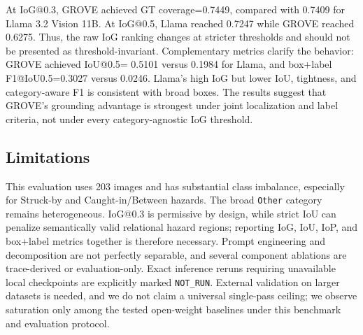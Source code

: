 At IoG@0.3, GROVE achieved GT coverage=0.7449, compared
with 0.7409 for Llama 3.2 Vision 11B. At
IoG@0.5, Llama reached 0.7247 while GROVE
reached 0.6275. Thus, the raw IoG ranking changes at
stricter thresholds and should not be presented as threshold-invariant.
Complementary metrics clarify the behavior: GROVE achieved IoU@0.5=
0.5101 versus
0.1984 for Llama, and box+label
F1@IoU0.5=0.3027 versus
0.0246. Llama's high IoG
but lower IoU, tightness, and category-aware F1 is consistent with broad boxes.
The results suggest that GROVE's grounding advantage is strongest under joint
localization and label criteria, not under every category-agnostic IoG
threshold.

\subsection{Limitations}

This evaluation uses 203 images and has substantial class imbalance, especially
for Struck-by and Caught-in/Between hazards. The broad \texttt{Other} category
remains heterogeneous. IoG@0.3 is permissive by design, while strict IoU can
penalize semantically valid relational hazard regions; reporting IoG, IoU, IoP,
and box+label metrics together is therefore necessary. Prompt engineering and
decomposition are not perfectly separable, and several component ablations are
trace-derived or evaluation-only. Exact inference reruns requiring unavailable
local checkpoints are explicitly marked \texttt{NOT\_RUN}. External
validation on larger datasets is needed, and we do not claim a universal
single-pass ceiling; we observe saturation only among the tested open-weight
baselines under this benchmark and evaluation protocol.
